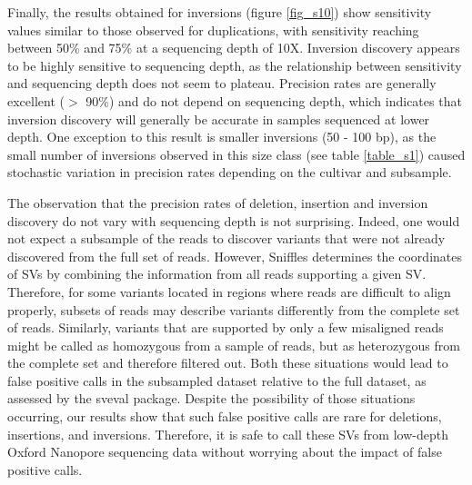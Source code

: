 \documentclass[12pt]{article}
\begin{document}
Finally, the results obtained for inversions (figure \ref{fig_s10}) show sensitivity values similar to those observed for duplications, with sensitivity reaching between 50\% and 75\% at a sequencing depth of 10X.
Inversion discovery appears to be highly sensitive to sequencing depth, as the relationship between sensitivity and sequencing depth does not seem to plateau.
Precision rates are generally excellent ($>$ 90\%) and do not depend on sequencing depth, which indicates that inversion discovery will generally be accurate in samples sequenced at lower depth.
One exception to this result is smaller inversions (50 - 100 bp), as the small number of inversions observed in this size class (see table \ref{table_s1}) caused stochastic variation in precision rates depending on the cultivar and subsample.

The observation that the precision rates of deletion, insertion and inversion discovery do not vary with sequencing depth is not surprising.
Indeed, one would not expect a subsample of the reads to discover variants that were not already discovered from the full set of reads.
However, Sniffles determines the coordinates of SVs by combining the information from all reads supporting a given SV.
Therefore, for some variants located in regions where reads are difficult to align properly, subsets of reads may describe variants differently from the complete set of reads.
Similarly, variants that are supported by only a few misaligned reads might be called as homozygous from a sample of reads, but as heterozygous from the complete set and therefore filtered out.
Both these situations would lead to false positive calls in the subsampled dataset relative to the full dataset, as assessed by the sveval package.
Despite the possibility of those situations occurring, our results show that such false positive calls are rare for deletions, insertions, and inversions.
Therefore, it is safe to call these SVs from low-depth Oxford Nanopore sequencing data without worrying about the impact of false positive calls.

\end{document}
